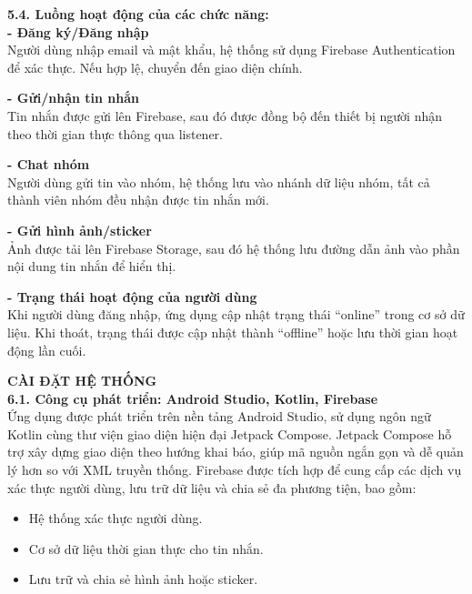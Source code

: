 \documentclass[12pt,a4paper]{article}
\begin{document}
	\textbf{5.4. Luồng hoạt động của các chức năng:} \\
	
	\hspace*{1cm} \textbf{- Đăng ký/Đăng nhập} \\
	\hspace*{1cm} Người dùng nhập email và mật khẩu, hệ thống sử dụng Firebase Authentication để xác thực. Nếu hợp lệ, chuyển đến giao diện chính.
	
	\hspace*{1cm} \textbf{- Gửi/nhận tin nhắn} \\
	\hspace*{1cm} Tin nhắn được gửi lên Firebase, sau đó được đồng bộ đến thiết bị người nhận theo thời gian thực thông qua listener.
	
	\hspace*{1cm} \textbf{- Chat nhóm} \\
	\hspace*{1cm} Người dùng gửi tin vào nhóm, hệ thống lưu vào nhánh dữ liệu nhóm, tất cả thành viên nhóm đều nhận được tin nhắn mới.
	
	\hspace*{1cm} \textbf{- Gửi hình ảnh/sticker} \\
	\hspace*{1cm} Ảnh được tải lên Firebase Storage, sau đó hệ thống lưu đường dẫn ảnh vào phần nội dung tin nhắn để hiển thị.
	
	\hspace*{1cm} \textbf{- Trạng thái hoạt động của người dùng} \\
	\hspace*{1cm} Khi người dùng đăng nhập, ứng dụng cập nhật trạng thái “online” trong cơ sở dữ liệu. Khi thoát, trạng thái được cập nhật thành “offline” hoặc lưu thời gian hoạt động lần cuối.
	\vspace{0.5cm}
	
	\vspace{0.5cm}
	\noindent\textbf{CÀI ĐẶT HỆ THỐNG} \\
	
	\vspace{0.3cm}
	\noindent\textbf{6.1. Công cụ phát triển: Android Studio, Kotlin, Firebase} \\
	Ứng dụng được phát triển trên nền tảng Android Studio, sử dụng ngôn ngữ Kotlin cùng thư viện giao diện hiện đại Jetpack Compose. Jetpack Compose hỗ trợ xây dựng giao diện theo hướng khai báo, giúp mã nguồn ngắn gọn và dễ quản lý hơn so với XML truyền thống. Firebase được tích hợp để cung cấp các dịch vụ xác thực người dùng, lưu trữ dữ liệu và chia sẻ đa phương tiện, bao gồm:
	\begin{itemize}
		\item Hệ thống xác thực người dùng.
		\item Cơ sở dữ liệu thời gian thực cho tin nhắn.
		\item Lưu trữ và chia sẻ hình ảnh hoặc sticker.
	\end{itemize}
	
\end{document}
